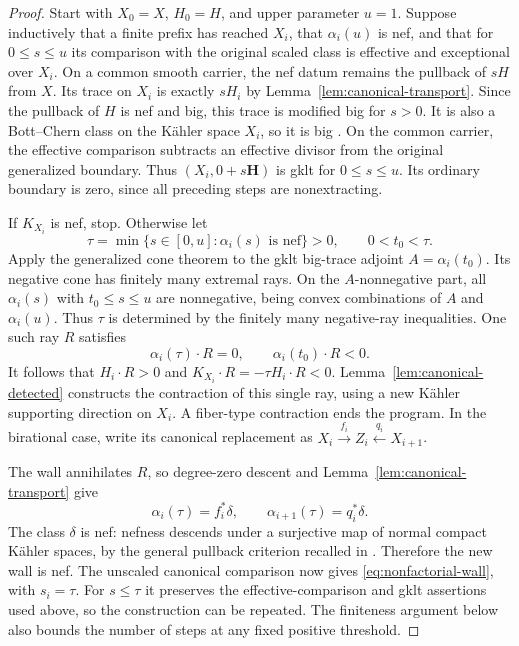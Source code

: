 \documentclass[11pt,a4paper]{article}
\numberwithin{equation}{section}
\theoremstyle{definition}
\theoremstyle{remark}
\begin{document}
\begin{proof}
Start with $X_0=X$, $H_0=H$, and upper parameter $u=1$.
Suppose inductively that a finite prefix has reached $X_i$, that
$\alpha_i(u)$ is nef, and that for $0\le s\le u$ its comparison
with the original scaled class is effective and exceptional over
$X_i$. On a common smooth carrier, the nef datum remains the
pullback of $sH$ from $X$. Its trace on $X_i$ is exactly $sH_i$
by Lemma~\ref{lem:canonical-transport}. Since the pullback of $H$
is nef and big, this trace is modified big for $s>0$. It is also
a Bott--Chern class on the Kähler space $X_i$, so it is big
\cite[Definition~2.8]{HX2026}. On the common carrier, the effective comparison subtracts an
effective divisor from the original generalized boundary. Thus
$(X_i,0+s\mathbf H)$ is gklt for $0\le s\le u$. Its ordinary
boundary is zero, since all preceding steps are nonextracting.

If $K_{X_i}$ is nef, stop. Otherwise let
\[
 \tau=\min\{s\in[0,u]:\alpha_i(s)\text{ is nef}\}>0,
 \qquad 0<t_0<\tau.
\]
Apply the generalized cone theorem
\cite[Corollary~3.6]{HLX2026} to the gklt big-trace adjoint
$A=\alpha_i(t_0)$. Its negative cone has finitely many extremal
rays. On the $A$-nonnegative part, all $\alpha_i(s)$ with
$t_0\le s\le u$ are nonnegative, being convex combinations of
$A$ and $\alpha_i(u)$. Thus $\tau$ is determined by the finitely
many negative-ray inequalities. One such ray $R$ satisfies
\[
 \alpha_i(\tau)\cdot R=0,
 \qquad\alpha_i(t_0)\cdot R<0.
\]
It follows that $H_i\cdot R>0$ and
$K_{X_i}\cdot R=-\tau H_i\cdot R<0$.
Lemma~\ref{lem:canonical-detected} constructs the contraction of
this single ray, using a new Kähler supporting direction on $X_i$.
A fiber-type contraction ends the program. In the birational case,
write its canonical replacement as
$X_i\xrightarrow{f_i}Z_i\xleftarrow{q_i}X_{i+1}$.

The wall annihilates $R$, so degree-zero descent and
Lemma~\ref{lem:canonical-transport} give
\[
 \alpha_i(\tau)=f_i^*\delta,
 \qquad\alpha_{i+1}(\tau)=q_i^*\delta.
\]
The class $\delta$ is nef: nefness descends under a surjective
map of normal compact Kähler spaces, by the general pullback
criterion recalled in \cite[Section~2.4]{HX2026}. Therefore the
new wall is nef. The unscaled canonical comparison now gives
\eqref{eq:nonfactorial-wall}, with $s_i=\tau$.
For $s\le\tau$ it preserves the effective-comparison and gklt
assertions used above, so the construction can be repeated.
The finiteness argument below also bounds the number of steps at
any fixed positive threshold.


\end{proof}
\end{document}
